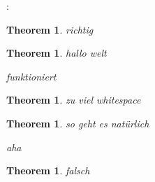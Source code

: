 \documentclass{article}
\begin{document}

   {}
   {}
   {}
   {}
   {\normalfont\bfseries}
   {:}
   {\newline} 
   {}
\let\oldenum\enumerate
\let\endoldenum\endenumerate
\renewenvironment{enumerate}{
\mbox{}\vspace{-2em}
\begin{oldenum}
  \setlength{\itemsep}{1pt}
  \setlength{\parskip}{0pt}
  \setlength{\parsep}{0pt}
}{\end{oldenum}}

\theoremstyle{style}

\newtheorem{thm}[subsection]{Theorem}

\begin{thm}
	richtig
\end{thm}

\begin{thm}hallo welt
	\begin{enumerate} 
		\item funktioniert
	\end{enumerate}
\end{thm}

\begin{thm}\mbox{}
	\begin{enumerate} 
		\item zu viel whitespace
	\end{enumerate}
\end{thm}

\begin{thm}\mbox{}\vspace{-2em}
	\begin{enumerate} 
		\item so geht es natürlich
		\item aha
	\end{enumerate}
\end{thm}

\begin{thm}
	\begin{enumerate}
		\item falsch
	\end{enumerate}
\end{thm}
\end{document}
